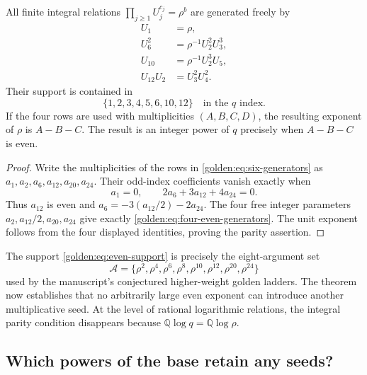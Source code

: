 \begin{corollary}
\label{golden:cor:even-seeds}
All finite integral relations
$\prod_{j\ge1}U_j^{c_j}=\rho^b$ are generated freely by
\begin{equation}
\begin{aligned}
 U_1&=\rho,\\
 U_6^2&=\rho^{-1}U_2^2U_3^3,\\
 U_{10}&=\rho^{-1}U_2^3U_5,\\
 U_{12}U_2&=U_3^2U_4^2.
\end{aligned}
\label{golden:eq:four-even-generators}
\end{equation}
Their support is contained in
\begin{equation}
 \{1,2,3,4,5,6,10,12\}
 \quad\text{in the $q$ index}.
 \label{golden:eq:even-support}
\end{equation}
If the four rows are used with multiplicities $(A,B,C,D)$,
the resulting exponent of $\rho$ is $A-B-C$.
The result is an integer power of $q$ precisely when $A-B-C$ is even.
\end{corollary}

\begin{proof}
Write the multiplicities of the rows in
\eqref{golden:eq:six-generators} as
$a_1,a_2,a_6,a_{12},a_{20},a_{24}$.
Their odd-index coefficients vanish exactly when
\[
 a_1=0,\qquad 2a_6+3a_{12}+4a_{24}=0.
\]
Thus $a_{12}$ is even and
$a_6=-3(a_{12}/2)-2a_{24}$.
The four free integer parameters
$a_2,a_{12}/2,a_{20},a_{24}$ give exactly
\eqref{golden:eq:four-even-generators}.  The unit exponent follows
from the four displayed identities, proving the parity assertion.
\end{proof}

The support \eqref{golden:eq:even-support} is precisely the
eight-argument set
\begin{equation}
 \mathcal A=\{\rho^2,\rho^4,\rho^6,\rho^8,
                 \rho^{10},\rho^{12},\rho^{20},\rho^{24}\}
 \label{golden:eq:manuscript-alphabet}
\end{equation}
used by the manuscript's conjectured higher-weight golden ladders.
The theorem now establishes that no arbitrarily large even exponent
can introduce another multiplicative seed.  At the level of rational
logarithmic relations, the integral parity condition disappears because
$\mathbb Q\log q=\mathbb Q\log\rho$.

\subsection{Which powers of the base retain any seeds?}
\label{golden:subsec:power-restriction}

